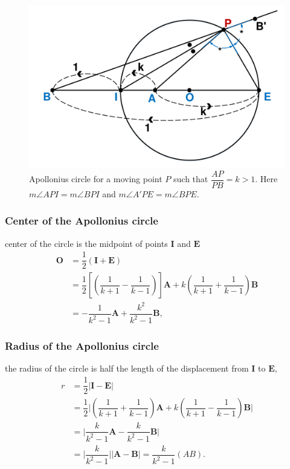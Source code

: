 \documentclass{beamer}
\begin{document}
\begin{frame}
\begin{figure}[htb]
\centering
\includegraphics[scale = 0.3]{fig/drawing2.pdf}
\caption{Apollonius circle for a moving point $P$ such that $\dfrac{AP}{PB}=k>1$. Here $m\angle API = m\angle BPI$ and $m\angle A'PE = m\angle BPE$.}
\label{1}
\end{figure}
\end{frame}
\begin{frame}
\frametitle{Center of the Apollonius circle}
center of the circle is the midpoint of points $\boldsymbol{I}$ and $\boldsymbol{E}$
\begin{equation}
\begin{split}
\boldsymbol{O} & = \dfrac{1}{2} (\boldsymbol{I}+\boldsymbol{E})\\
& = \dfrac{1}{2} [(\dfrac{1}{k+1}-\dfrac{1}{k-1})]\boldsymbol{A}+k(\dfrac{1}{k+1}+\dfrac{1}{k-1}) \boldsymbol{B}\\
& =-\dfrac{1}{k^{2}-1}\boldsymbol{A} + \dfrac{{k^{2}}}{k^{2}-1} \boldsymbol{B},
\end{split}
\label{eqn:center}
\end{equation}
\end{frame}
\begin{frame}
\frametitle{Radius of the Apollonius circle}
the radius of the circle is half the length of the displacement from $\boldsymbol{I}$ to $\boldsymbol{E}$,
\begin{equation}
\begin{split}
r & =\dfrac{1}{2} \lvert \boldsymbol{I} -\boldsymbol{E}\rvert \\
& = \dfrac{1}{2} \lvert (\dfrac{1}{k+1}+\dfrac{1}{k-1})\boldsymbol{A}+k(\dfrac{1}{k+1}-\dfrac{1}{k-1}) \boldsymbol{B}\rvert \\
& =  \lvert\dfrac{k}{k^{2}-1}\boldsymbol{A} - \dfrac{k}{k^{2}-1} \boldsymbol{B}\rvert\\
& = \lvert\dfrac{k}{k^{2}-1}\rvert \lvert\boldsymbol{A} -\boldsymbol{B}\rvert = \dfrac{k}{k^{2}-1}(AB).
\end{split}
\label{eqn:radius}
\end{equation}
\end{frame}
\end{document}
